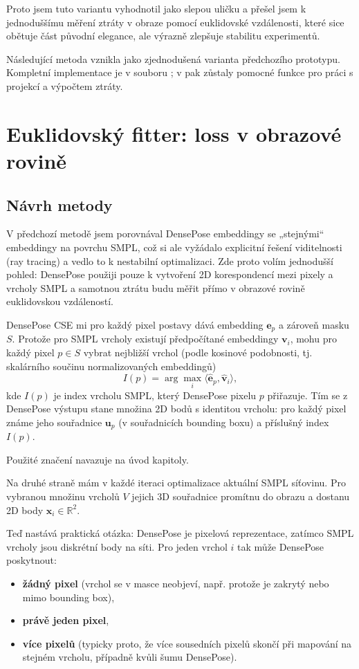 \documentclass[11pt,a4paper,twoside,openright]{report}
\begin{document}
Proto jsem tuto variantu vyhodnotil jako slepou uličku a přešel jsem k jednoduššímu měření ztráty v obraze pomocí euklidovské vzdálenosti, které sice obětuje část původní elegance, ale výrazně zlepšuje stabilitu experimentů.

Následující metoda  vznikla jako zjednodušená varianta předchozího prototypu. Kompletní implementace je v souboru ; v  pak zůstaly pomocné funkce pro práci s projekcí a výpočtem ztráty.

\section{Euklidovský fitter: loss v obrazové rovině}

\subsection{Návrh metody}

V předchozí metodě jsem porovnával DensePose embeddingy se „stejnými“ embeddingy na povrchu SMPL, což si ale vyžádalo explicitní řešení viditelnosti (ray tracing) a vedlo to k nestabilní optimalizaci. Zde proto volím jednodušší pohled: DensePose použiji pouze k vytvoření 2D korespondencí mezi pixely a vrcholy SMPL a samotnou ztrátu budu měřit přímo v obrazové rovině euklidovskou vzdáleností.

DensePose CSE mi pro každý pixel postavy dává embedding $\mathbf{e}_p$ a zároveň masku $S$. Protože pro SMPL vrcholy existují předpočítané embeddingy $\mathbf{v}_i$, mohu pro každý pixel $p \in S$ vybrat nejbližší vrchol (podle kosinové podobnosti, tj. skalárního součinu normalizovaných embeddingů)
\[
I(p) = \arg\max_i \langle \hat{\mathbf{e}}_p, \hat{\mathbf{v}}_i \rangle,
\]
kde $I(p)$ je index vrcholu SMPL, který DensePose pixelu $p$ přiřazuje. Tím se z DensePose výstupu stane množina 2D bodů s identitou vrcholu: pro každý pixel známe jeho souřadnice $\mathbf{u}_p$ (v souřadnicích bounding boxu) a příslušný index $I(p)$.

Použité značení navazuje na úvod kapitoly.

Na druhé straně mám v každé iteraci optimalizace aktuální SMPL síťovinu. Pro vybranou množinu vrcholů $V$ jejich 3D souřadnice promítnu do obrazu a dostanu 2D body $\mathbf{x}_i \in \mathbb{R}^2$.

Teď nastává praktická otázka: DensePose je pixelová reprezentace, zatímco SMPL vrcholy jsou diskrétní body na síti. Pro jeden vrchol $i$ tak může DensePose poskytnout:
\begin{itemize}
    \item \textbf{žádný pixel} (vrchol se v masce neobjeví, např. protože je zakrytý nebo mimo bounding box),
    \item \textbf{právě jeden pixel},
    \item \textbf{více pixelů} (typicky proto, že více sousedních pixelů skončí při mapování na stejném vrcholu, případně kvůli šumu DensePose).
\end{itemize}
\end{document}
